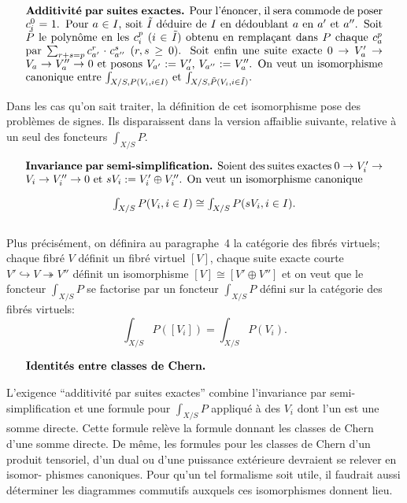 \documentclass[12pt,a4paper]{article}
\theoremstyle{plain}
\theoremstyle{definition}
\begin{document}
\begin{equation}\label{eq:2.1.6}
\parbox{\dimexpr\linewidth-2em}{%
\textbf{Additivit\'e par suites exactes.} Pour l'\'enoncer, il sera commode de poser
$c_i^0 = 1$. Pour $a \in I$, soit $\tilde{I}$ d\'eduire de $I$ en d\'edoublant $a$ en $a'$ et $a''$.
Soit $\tilde{P}$ le polyn\^ome en les $c_i^p$ ($i \in \tilde{I}$) obtenu en rempla\c{c}ant dans $P$ chaque
$c_a^p$ par $\sum_{r+s=p} c_{a'}^r \cdot c_{a''}^s$ ($r,s \geq 0$). Soit enfin une suite exacte
$0 \to V_a' \to V_a \to V_a'' \to 0$
et posons $V_{a'} := V_a'$, $V_{a''} := V_a''$. On veut un isomorphisme canonique entre
$\int_{X/S, P(V_i, i \in I)}$ et $\int_{X/S, \tilde{P}(V_i, i \in \tilde{I})}$.}
\end{equation}

Dans les cas qu'on sait traiter, la d\'efinition de cet isomorphisme pose des
probl\`emes de signes. Ils disparaissent dans la version affaiblie suivante, relative
\`a un seul des foncteurs $\int_{X/S} P$.

\begin{equation}\label{eq:2.1.7}
\parbox{\dimexpr\linewidth-2em}{%
\textbf{Invariance par semi-simplification.} Soient des suites exactes $0 \to V_i' \to
V_i \to V_i'' \to 0$ et $sV_i := V_i' \oplus V_i''$. On veut un isomorphisme canonique
\[
\textstyle \int_{X/S} P(V_i, i \in I) \cong \int_{X/S} P(sV_i, i \in I) .
\]}
\end{equation}

Plus pr\'ecis\'ement, on d\'efinira au paragraphe~4 la cat\'egorie des fibr\'es virtuels;
chaque fibr\'e $V$ d\'efinit un fibr\'e virtuel $[V]$, chaque suite exacte courte $V' \hookrightarrow
V \twoheadrightarrow V''$ d\'efinit un isomorphisme $[V] \cong [V' \oplus V'']$ et on veut que le foncteur $\int_{X/S} P$
se factorise par un foncteur $\int_{X/S} P$ d\'efini sur la cat\'egorie des fibr\'es virtuels:
\[
\textstyle \int_{X/S} P([V_i]) = \int_{X/S} P(V_i) .
\]

\begin{equation}\label{eq:2.1.8}
\parbox{\dimexpr\linewidth-2em}{%
\textbf{Identit\'es entre classes de Chern.}}
\end{equation}

L'exigence ``additivit\'e par suites exactes'' combine l'invariance par semi-
simplification et une formule pour $\int_{X/S} P$ appliqu\'e \`a des $V_i$ dont l'un est
une somme directe. Cette formule rel\`eve la formule donnant les classes de Chern
d'une somme directe. De m\^eme, les formules pour les classes de Chern d'un produit
tensoriel, d'un dual ou d'une puissance ext\'erieure devraient se relever en isomor-
phismes canoniques. Pour qu'un tel formalisme soit utile, il faudrait aussi
d\'eterminer les diagrammes commutifs auxquels ces isomorphismes donnent lieu.
\end{document}
